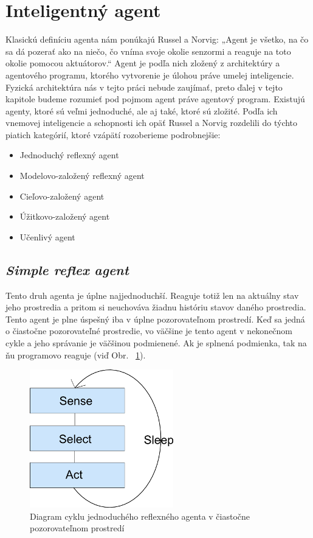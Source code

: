 \documentclass[12pt,a4paper]{report}
\begin{document}
\section{Inteligentný agent}
	Klasickú definíciu agenta nám ponúkajú Russel a Norvig:
„Agent je všetko, na čo sa dá pozerať ako na niečo, čo vníma svoje okolie senzormi a reaguje na toto okolie pomocou aktuátorov.“ 
Agent je podľa nich zložený z architektúry a agentového programu, ktorého vytvorenie je úlohou práve umelej inteligencie. Fyzická architektúra nás v tejto práci nebude zaujímať, preto ďalej v tejto kapitole budeme rozumieť pod pojmom agent práve agentový program. Existujú agenty, ktoré sú veľmi jednoduché, ale aj také, ktoré sú zložité. Podľa ich vnemovej inteligencie a schopnosti ich opäť Russel a Norvig rozdelili do týchto piatich kategórií, ktoré vzápätí rozoberieme podrobnejšie:
\begin{itemize}
	\item
	Jednoduchý reflexný agent
	\item
	Modelovo-založený reflexný agent
	\item
	Cieľovo-založený agent
	\item
	Úžitkovo-založený agent
	\item
	Učenlivý agent
\end{itemize}
\newpage
\subsection{\textit{Simple reflex agent}} 
	Tento druh agenta je úplne najjednoduchší. Reaguje totiž len na aktuálny stav jeho prostredia a pritom si neuchováva žiadnu históriu stavov daného prostredia. Tento agent je plne úspešný iba v úplne pozorovateľnom prostredí. Keď sa jedná o čiastočne pozorovateľné prostredie, vo väčšine je tento agent v nekonečnom cykle a jeho správanie je väčšinou podmienené. Ak je splnená podmienka, tak na ňu programovo reaguje (viď Obr. ~\ref{fig:lifecycle}). 

\begin{figure}[h!]
\centering
  \caption{Diagram cyklu jednoduchého reflexného agenta v čiastočne pozorovateľnom prostredí}
  \label{fig:lifecycle}
  \includegraphics{lifecycle}
\end{figure}
\end{document}

